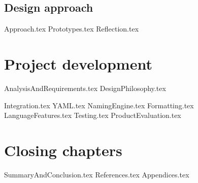\documentclass{article} %
\begin{document}
\subsection{Design approach}
{Approach.tex}
{Prototypes.tex}
{Reflection.tex}

\newpage
\section{Project development}
{AnalysisAndRequirements.tex}
{DesignPhilosophy.tex}

{Integration.tex}
{YAML.tex}
{NamingEngine.tex}
{Formatting.tex}
{LanguageFeatures.tex}
{Testing.tex}
{ProductEvaluation.tex}

\newpage
\section{Closing chapters}
{SummaryAndConclusion.tex}
{References.tex}
{Appendices.tex}
\end{document}

